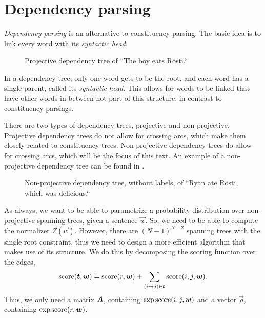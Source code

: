 \section{Dependency parsing}

\textit{Dependency parsing} is an alternative to constituency parsing. The
basic idea is to link every word with its \textit{syntactic head}.

\begin{figure}[h!]
    \centering
    \caption{Projective dependency tree of ``The boy eats Rösti.``}
    \label{fig:dependency-parse}
\end{figure}

In a dependency tree, only one word gets to be the root, and each word has a
single parent, called its \textit{syntactic head}. This allows for words to be
linked that have other words in between not part of this structure, in contrast
to constituency parsings.

There are two types of dependency trees, projective and non-projective.
Projective dependency trees do not allow for crossing arcs, which make them
closely related to constituency trees. Non-projective dependency trees do allow
for crossing arcs, which will be the focus of this text. An example of a
non-projective dependency tree can be found in
.

\begin{figure}[ht]
    \centering
    \caption{Non-projective dependency tree, without labels, of ``Ryan ate
        Rösti, which was delicious.``}
    \label{fig:non-projective-dependency-tree}
\end{figure}

As always, we want to be able to parametrize a probability distribution over
non-projective spanning trees, given a sentence $\vec{w}$. So, we need to be
able to compute the normalizer $Z(\vec{w})$. However, there are $(N-1)^{N-2}$
spanning trees with the single root constraint, thus we need to design a more
efficient algorithm that makes use of its structure. We do this by decomposing
the scoring function over the edges, \[
    \mathrm{score}(\bm{t},\bm{w}) \doteq \mathrm{score}(r,\bm{w}) + \sum_{(i\to j)\in\bm{t}} \mathrm{score}(i,j,\bm{w})
    .\]
Thus, we only need a matrix $\bm{A}$, containing $\exp \mathrm{score}(i,j,\bm{w})$ and a
vector $\vec{\rho}$, containing $\exp \mathrm{score}(r,\bm{w})$.


